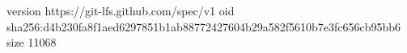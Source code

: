 version https://git-lfs.github.com/spec/v1
oid sha256:d4b230fa8f1aed6297851b1ab88772427604b29a582f5610b7e3fc656cb95bb6
size 11068
